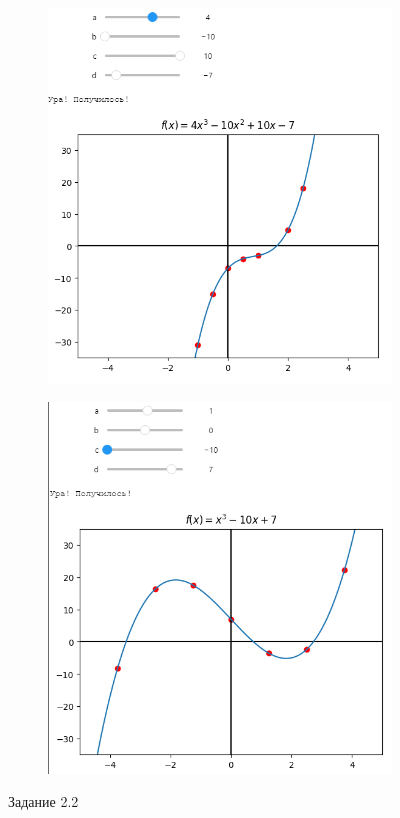\documentclass[14pt,a4paper]{extarticle}
\begin{document}
\begin{figure}[h!]
    \begin{subfigure}{.5\textwidth}
        \centering
        \includegraphics[width=0.9\linewidth]{figures//inftech//prac2/2.2-first.png}
    \end{subfigure}%
    \begin{subfigure}{.5\textwidth}
        \centering
        \includegraphics[width=0.9\linewidth]{figures//inftech//prac2/2.2-second.png}
    \end{subfigure}

    \caption{Задание 2.2}
    \label{fig:2.2}
\end{figure}
\end{document}
